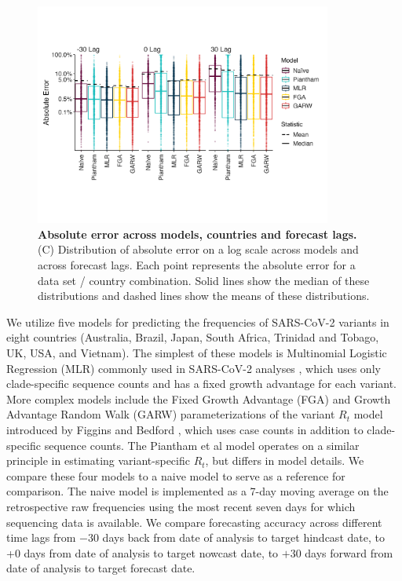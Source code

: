 \documentclass[11pt,oneside,letterpaper]{article}
\begin{document}
\begin{figure}[tb!]
	\centering
	\includegraphics[width=0.87\textwidth]{figures/model_comp_B.png}
	\caption{\textbf{Absolute error across models, countries and forecast lags.}
	(C) Distribution of absolute error on a log scale across models and across forecast lags.
	Each point represents the absolute error for a data set / country combination.
	Solid lines show the median of these distributions and dashed lines show the means of these distributions.
	}
	\label{fig:model_comp_B}
\end{figure}



We utilize five models for predicting the frequencies of SARS-CoV-2 variants in eight countries (Australia, Brazil, Japan, South Africa, Trinidad and Tobago, UK, USA, and Vietnam).
The simplest of these models is Multinomial Logistic Regression (MLR) commonly used in SARS-CoV-2 analyses \cite{annavajhala2021emergence, faria2021genomics, obermeyer2022analysis, susswein2023early}, which uses only clade-specific sequence counts and has a fixed growth advantage for each variant.
More complex models include the Fixed Growth Advantage (FGA) and Growth Advantage Random Walk (GARW) parameterizations of the variant $R_t$ model introduced by Figgins and Bedford \cite{figgins2022sars}, which uses case counts in addition to clade-specific sequence counts.
The Piantham et al model \cite{piantham2021estimating} operates on a similar principle in estimating variant-specific $R_t$, but differs in model details.
We compare these four models to a naive model to serve as a reference for comparison.
The naive model is implemented as a 7-day moving average on the retrospective raw frequencies using the most recent seven days for which sequencing data is available.
We compare forecasting accuracy across different time lags from $-30$ days back from date of analysis to target hindcast date, to +0 days from date of analysis to target nowcast date, to $+30$ days forward from date of analysis to target forecast date.
\end{document}
